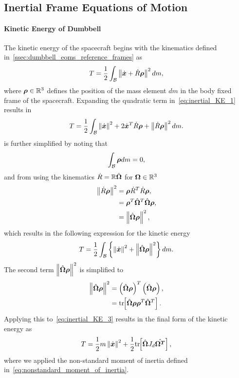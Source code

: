\subsection{Inertial Frame Equations of Motion}\label{sec:inertial_dumbbell_eoms}

\paragraph{Kinetic Energy of Dumbbell}\label{sec:inertial_kinetic_energy}
The kinetic energy of the spacecraft begins with the kinematics defined in~\cref{ssec:dumbbell_eoms_reference_frames} as
\begin{align}\label{eq:inertial_KE_1}
    T = \frac{1}{2} \int_{\mathcal{B}} \left\|  \dot{\bm{x}} + \dot{R} \bm{\rho} \right\|^2 dm,
\end{align}
where \( \bm{\rho} \in \mathbb{R}^3 \) defines the position of the mass element \( dm \) in the body fixed frame of the spacecraft.
Expanding the quadratic term in~\cref{eq:inertial_KE_1} results in
\begin{align}\label{eq:inertial_KE_2}
T = \frac{1}{2} \int_{\mathcal{B}}  \left\| \dot{\bm{x}} \right\|^2 + 2 \dot{\bm{x}}^T \dot{R} \bm{\rho} + \left\| \dot{R} \bm{\rho}  \right\|^2    dm .
\end{align}
 is further simplified by noting that
\begin{align*}
    \int_{\mathcal{B}} \bm{\rho} dm = 0,
\end{align*}
and from using the kinematics \( \dot{R} = \mathbb{R} \hat{\bm{\Omega}} \) for \( \bm{\Omega} \in \mathbb{R}^3 \) 
\begin{align*}
    \left\| \dot{R} \bm{\rho}  \right\|^2 &= \bm{\rho}\dot{R}^T \dot{R} \bm{\rho} , \\
                                &=  \bm{\rho}^T \hat{\bm{\Omega}}^T \hat{\bm{\Omega}} \bm{\rho} , \\
                                &= \left\|  \hat{\bm{\Omega}} \bm{\rho}  \right\|^2, 
\end{align*}
which results in the following expression for the kinetic energy
\begin{align}\label{eq:inertial_KE_3}
    T = \frac{1}{2} \int_{\mathcal{B}} \left\{  \left\| \dot{\bm{x}} \right\|^2 + \left\| \hat{\bm{\Omega}} \bm{\rho} \right\|^2  \right\} dm.
\end{align}
The second term \( \left\| \hat{\bm{\Omega}}\bm{\rho} \right\|^2 \) is simplified to
\begin{align}
    \left\|  \hat{\bm{\Omega}}\bm{\rho}  \right\|^2 &= \left(  \hat{\bm{\Omega}}\bm{\rho} \right)^T \left( \hat{\bm{\Omega}}\bm{\rho} \right) , \\
                                    &= \mathrm{tr}\negthickspace\left[  \hat{\bm{\Omega}} \bm{\rho} \bm{\rho}^T \hat{\bm{\Omega}}^T  \right].
\end{align}
Applying this to~\cref{eq:inertial_KE_3} results in the final form of the kinetic energy as
\begin{align}\label{eq:inertial_kinetic_energy}
    T = \frac{1}{2} m \left\| \dot{\bm{x}} \right\|^2 + \frac{1}{2} \mathrm{tr}\negthickspace\left[  \hat{\bm{\Omega}}J_d \hat{\bm{\Omega^T }}  \right], 
\end{align}
where we applied the non-standard moment of inertia defined in~\cref{eq:nonstandard_moment_of_inertia}.


